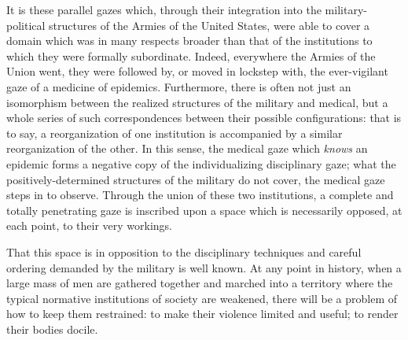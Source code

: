 \documentclass{report}
\begin{document}
  It is these parallel gazes which, through their integration into the military-political structures of the Armies of the United States, were able to cover
  a domain which was in many respects broader than that of the institutions to which they were formally subordinate. Indeed, everywhere the Armies
  of the Union went, they were followed by, or moved in lockstep with, the ever-vigilant gaze of a medicine of epidemics. Furthermore,
  there is often not just an isomorphism between the realized structures of the military and medical, but a whole series of such correspondences
  between their possible configurations: that is to say, a reorganization of one institution is accompanied by a similar reorganization of the
  other. In this sense, the medical gaze which \textit{knows} an epidemic forms a negative copy of the individualizing disciplinary gaze; what the
  positively-determined structures of the military do not cover, the medical gaze steps in to observe. Through the union of these two institutions,
  a complete and totally penetrating gaze is inscribed upon a space which is necessarily opposed, at each point, to their very workings.

  That this space is in opposition to the disciplinary techniques and careful ordering demanded by the military is well known. At any point
  in history, when a large mass of men are gathered together and marched into a territory where the typical normative institutions
  of society are weakened, there will be a problem of how to keep them restrained: to make their violence limited and useful; to render their
  bodies docile.

  \newpage
  \nocite{*}
  \printbibliography
\end{document}
